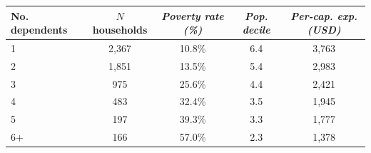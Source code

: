 \begin{tabular}{lcccc}
   \tabularnewline \midrule \midrule
   No. dependents & $N$ households & \emph{Poverty rate (\%)} & \emph{Pop. decile} & \emph{Per-cap. exp. (USD)} \\
\midrule
1 & 2,367 & 10.8\% & 6.4 & 3,763 \\
2 & 1,851 & 13.5\% & 5.4 & 2,983 \\
3 & 975 & 25.6\% & 4.4 & 2,421 \\
4 & 483 & 32.4\% & 3.5 & 1,945 \\
5 & 197 & 39.3\% & 3.3 & 1,777 \\
6+ & 166 & 57.0\% & 2.3 & 1,378 \\
\bottomrule
\end{tabular}
